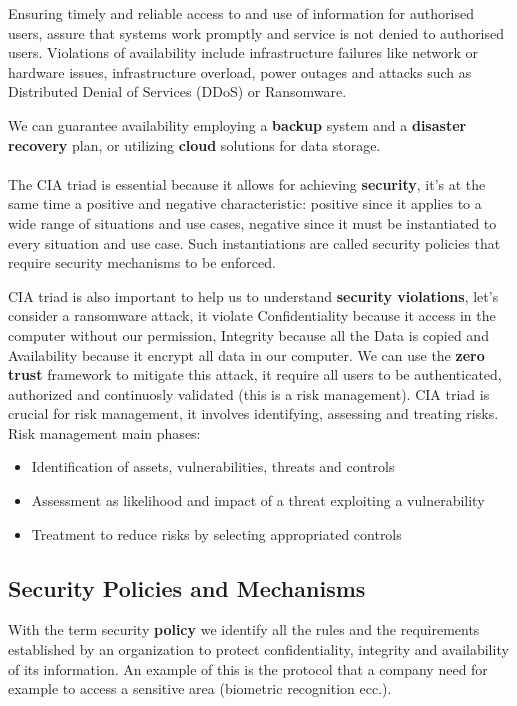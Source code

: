     Ensuring timely and reliable access to and use of information for authorised users, assure that systems work promptly and service is not denied to authorised users. Violations of availability include infrastructure failures like network or hardware issues, infrastructure overload, power outages and attacks such as Distributed Denial of Services (DDoS) or Ransomware.
    
    We can guarantee availability employing a \textbf{backup} system and a \textbf{disaster recovery} plan, or utilizing \textbf{cloud} solutions for data storage.
    \\\\
    The CIA triad is essential because it allows for achieving \textbf{security}, it's at the same time a positive and negative characteristic: positive since it applies to a wide range of situations and use cases, negative since it must be instantiated to every situation and use case. Such instantiations are called security policies that require security mechanisms to be enforced.
    
    CIA triad is also important to help us to understand \textbf{security violations}, let's consider a ransomware attack, it violate Confidentiality because it access in the computer without our permission, Integrity because all the Data is copied and Availability because it encrypt all data in our computer. We can use the \textbf{zero trust} framework to mitigate this attack, it require all users to be authenticated, authorized and continuosly validated (this is a risk management). CIA triad is crucial for risk management, it involves identifying, assessing and treating risks.
    Risk management main phases:
    \begin{itemize}
        \item Identification of assets, vulnerabilities, threats and controls
        \item Assessment as likelihood and impact of a threat exploiting a vulnerability
        \item Treatment to reduce risks by selecting appropriated controls
    \end{itemize}   
    
    \subsection{Security Policies and Mechanisms}
    With the term security \textbf{policy} we identify all the rules and the requirements established by an organization to protect confidentiality, integrity and availability of its information. An example of this is the protocol that a company need for example to access a sensitive area (biometric recognition ecc.).
    
